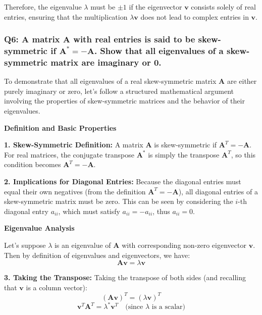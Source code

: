 \documentclass[8pt]{article}
\begin{document}
Therefore, the eigenvalue \(\lambda\) must be \(\pm 1\) if the eigenvector \(\mathbf{v}\) consists solely of real entries, ensuring that the multiplication \(\lambda \mathbf{v}\) does not lead to complex entries in \(\mathbf{v}\).

\subsubsection*{Q6: A matrix \(\mathbf{A}\) with real entries is said to be skew-symmetric if \(\mathbf{A}^* = -\mathbf{A}\). Show that all eigenvalues of a skew-symmetric matrix are imaginary or 0.}

To demonstrate that all eigenvalues of a real skew-symmetric matrix \(\mathbf{A}\) are either purely imaginary or zero, let's follow a structured mathematical argument involving the properties of skew-symmetric matrices and the behavior of their eigenvalues.

\textbf{Definition and Basic Properties}

\textbf{1. Skew-Symmetric Definition:}
   A matrix \(\mathbf{A}\) is skew-symmetric if \(\mathbf{A}^T = -\mathbf{A}\). For real matrices, the conjugate transpose \( \mathbf{A}^* \) is simply the transpose \( \mathbf{A}^T \), so this condition becomes \(\mathbf{A}^T = -\mathbf{A}\).

\textbf{2. Implications for Diagonal Entries:}
   Because the diagonal entries must equal their own negatives (from the definition \(\mathbf{A}^T = -\mathbf{A}\)), all diagonal entries of a skew-symmetric matrix must be zero. This can be seen by considering the \(i\)-th diagonal entry \( a_{ii} \), which must satisfy \( a_{ii} = -a_{ii} \), thus \( a_{ii} = 0 \).

\textbf{Eigenvalue Analysis}

Let's suppose \(\lambda\) is an eigenvalue of \(\mathbf{A}\) with corresponding non-zero eigenvector \(\mathbf{v}\). Then by definition of eigenvalues and eigenvectors, we have:
\[
\mathbf{A}\mathbf{v} = \lambda \mathbf{v}
\]

\textbf{3. Taking the Transpose:}
   Taking the transpose of both sides (and recalling that \( \mathbf{v} \) is a column vector):
   \[
   (\mathbf{A}\mathbf{v})^T = (\lambda \mathbf{v})^T
   \]
   \[
   \mathbf{v}^T \mathbf{A}^T = \lambda^* \mathbf{v}^T \quad \text{(since } \lambda \text{ is a scalar)}
   \]
\end{document}
